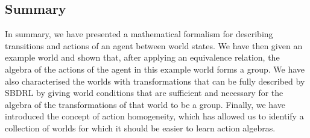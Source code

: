 
\subsection{Summary}
In summary, we have presented a mathematical formalism for describing transitions and actions of an agent between world states.
We have then given an example world and shown that, after applying an equivalence relation, the algebra of the actions of the agent in this example world forms a group.
We have also characterised the worlds with transformations that can be fully described by SBDRL by giving world conditions that are sufficient and necessary for the algebra of the transformations of that world to be a group.
Finally, we have introduced the concept of action homogeneity, which has allowed us to identify a collection of worlds for which it should be easier to learn action algebras.
